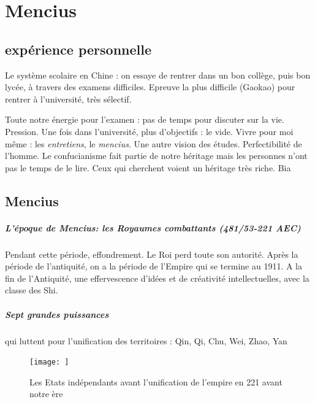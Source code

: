 \chapter{Mencius}
\section{expérience personnelle}

\begin{singlequote}

Le système scolaire en Chine : on essaye de rentrer dans un bon collège, puis bon lycée, à travers des examens difficiles. Epreuve la plus difficile (Gaokao) pour rentrer à l'université, très sélectif.

Toute notre énergie pour l'examen : pas de temps pour discuter sur la vie. Pression. Une fois dans l'université, plus d'objectifs : le vide. Vivre pour moi même : les \textit{entretiens}, le \textit{mencius}. Une autre vision des études. Perfectibilité de l'homme.  Le confucianisme fait partie de notre héritage mais les personnes n'ont pas le temps de le lire. Ceux qui cherchent voient un héritage très riche.    Bia 
\end{singlequote}


\section{Mencius}

\paragraph{L’époque de Mencius: les Royaumes combattants (481/53-221 AEC)} Pendant cette période, effondrement. Le Roi perd toute son autorité. Après la période de l'antiquité, on a la période de l'Empire qui se termine au 1911. A la fin de l'Antiquité, une effervescence d'idées et de créativité intellectuelles, avec la classe des Shi.

\paragraph{Sept grandes puissances} qui luttent pour l’unification des territoires :
Qin, Qi, Chu, Wei, Zhao, Yan


 \begin{figure}
     \centering
          \caption{Les Etats indépendants avant l’unification de l’empire en 221 avant notre ère}
     \texttt{[image: ]}

     \label{fig:enter-label}
 \end{figure}




